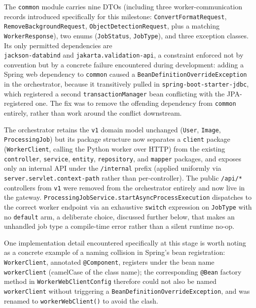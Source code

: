 \documentclass[twoside]{supsistudent}
\begin{document}
The \texttt{common} module carries nine DTOs (including three worker-communication records introduced specifically for this milestone: \texttt{ConvertFormatRequest}, \texttt{RemoveBackgroundRequest}, \texttt{ObjectDetectionRequest}, plus a matching \texttt{WorkerResponse}), two enums (\texttt{JobStatus}, \texttt{JobType}), and three exception classes. Its only permitted dependencies are \\ \texttt{jackson-databind} and \texttt{jakarta.validation-api}, a constraint enforced not by convention but by a concrete failure encountered during development: adding a Spring web dependency to \texttt{common} caused a \texttt{BeanDefinitionOverrideException} in the orchestrator, because it transitively pulled in \texttt{spring-boot-starter-jdbc}, which registered a second \texttt{transactionManager} bean conflicting with the JPA-registered one. The fix was to remove the offending dependency from \texttt{common} entirely, rather than work around the conflict downstream.

The orchestrator retains the \texttt{v1} domain model unchanged (\texttt{User}, \texttt{Image}, \texttt{ProcessingJob}) but its package structure now separates a \texttt{client} package (\texttt{WorkerClient}, calling the Python worker over HTTP) from the existing \texttt{controller}, \texttt{service}, \texttt{entity}, \texttt{repository}, and \texttt{mapper} packages, and exposes only an internal API under the \texttt{/internal} prefix (applied uniformly via \texttt{server.servlet.context-path} rather than per-controller). The public \texttt{/api/*} controllers from \texttt{v1} were removed from the orchestrator entirely and now live in the gateway. \texttt{ProcessingJobService.startAsyncProcessExecution} dispatches to the correct worker endpoint via an exhaustive \texttt{switch} expression on \texttt{JobType} with no \texttt{default} arm, a deliberate choice, discussed further below, that makes an unhandled job type a compile-time error rather than a silent runtime no-op.

One implementation detail encountered specifically at this stage is worth noting as a concrete example of a naming collision in Spring's bean registration: \texttt{WorkerClient}, annotated \texttt{@Component}, registers under the bean name \texttt{workerClient} (camelCase of the class name); the corresponding \texttt{@Bean} factory method in \texttt{WorkerWebClientConfig} therefore could not also be named \texttt{workerClient} without triggering a \texttt{BeanDefinitionOverrideException}, and was renamed to \texttt{workerWebClient()} to avoid the clash.
\end{document}
